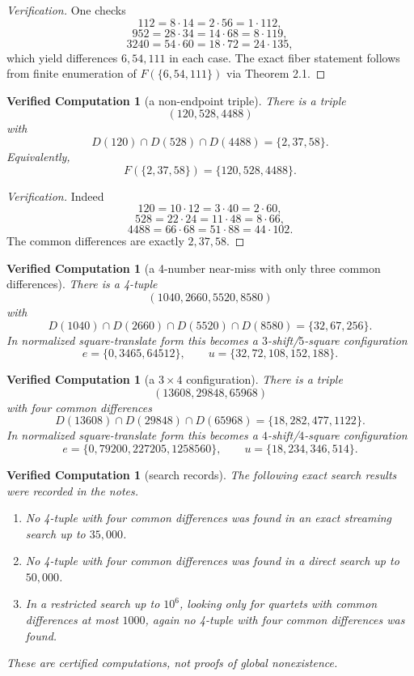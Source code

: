 \documentclass[11pt]{article}
\theoremstyle{plainbreak}
\theoremstyle{defbreak}
\newtheorem{computation}[theorem]{Verified Computation}
\newcommand{\Dset}{D}
\newcommand{\Fset}{F}
\begin{document}
\begin{proof}[Verification]
One checks
\[
112=8\cdot 14=2\cdot 56=1\cdot 112,
\]
\[
952=28\cdot 34=14\cdot 68=8\cdot 119,
\]
\[
3240=54\cdot 60=18\cdot 72=24\cdot 135,
\]
which yield differences $6,54,111$ in each case.  The exact fiber statement follows from finite enumeration of $\Fset(\{6,54,111\})$ via Theorem 2.1.
\end{proof}

\begin{computation}[a non-endpoint triple]
There is a triple
\[
(120,528,4488)
\]
with
\[
\Dset(120)\cap \Dset(528)\cap \Dset(4488)=\{2,37,58\}.
\]
Equivalently,
\[
\Fset(\{2,37,58\})=\{120,528,4488\}.
\]
\end{computation}

\begin{proof}[Verification]
Indeed
\[
120=10\cdot 12=3\cdot 40=2\cdot 60,
\]
\[
528=22\cdot 24=11\cdot 48=8\cdot 66,
\]
\[
4488=66\cdot 68=51\cdot 88=44\cdot 102.
\]
The common differences are exactly $2,37,58$.
\end{proof}

\begin{computation}[a 4-number near-miss with only three common differences]
There is a 4-tuple
\[
(1040,2660,5520,8580)
\]
with
\[
\Dset(1040)\cap \Dset(2660)\cap \Dset(5520)\cap \Dset(8580)=\{32,67,256\}.
\]
In normalized square-translate form this becomes a $3$-shift/$5$-square configuration
\[
e=\{0,3465,64512\},\qquad u=\{32,72,108,152,188\}.
\]
\end{computation}

\begin{computation}[a $3\times 4$ configuration]
There is a triple
\[
(13608,29848,65968)
\]
with four common differences
\[
\Dset(13608)\cap \Dset(29848)\cap \Dset(65968)=\{18,282,477,1122\}.
\]
In normalized square-translate form this becomes a $4$-shift/$4$-square configuration
\[
e=\{0,79200,227205,1258560\},\qquad u=\{18,234,346,514\}.
\]
\end{computation}

\begin{computation}[search records]
The following exact search results were recorded in the notes.
\begin{enumerate}[label=\textup{(\roman*)}]
    \item No 4-tuple with four common differences was found in an exact streaming search up to $35{,}000$.
    \item No 4-tuple with four common differences was found in a direct search up to $50{,}000$.
    \item In a restricted search up to $10^6$, looking only for quartets with common differences at most $1000$, again no 4-tuple with four common differences was found.
\end{enumerate}
These are certified computations, not proofs of global nonexistence.
\end{computation}
\end{document}

